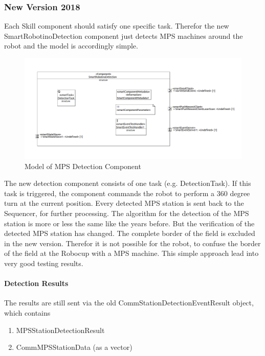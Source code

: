 \subsubsection{ New Version 2018}

Each Skill component should satisfy one specific task. Therefor the new SmartRobotinoDetection component just detects MPS machines around the robot and the model is accordingly simple.

\begin{figure}[h]
\centering
\includegraphics[scale=0.4]{pic/detectionComponent.png}
\caption{Model of MPS Detection Component}
\label{fig:dockingNew_overview}
\end{figure}

The new detection component consists of one task (e.g. DetectionTask). If this task is triggered, the component commands the robot to perform a 360 degree turn at the current position. Every detected MPS station is sent back to the Sequencer, for further processing. 
The algorithm for the detection of the MPS station is more or less the same like the years before. But the verification of the detected MPS station has changed. The complete border of the field is excluded in the new version. Therefor it is not possible for the robot, to confuse the border of the field at the Robocup with a MPS machine. This simple approach lead into very good testing results. 

\paragraph{Detection Results}
The results are still sent via the old CommStationDetectionEventResult object, which contains 

\begin{enumerate}
\item MPSStationDetectionResult
\item CommMPSStationData (as a vector)
\end{enumerate}

